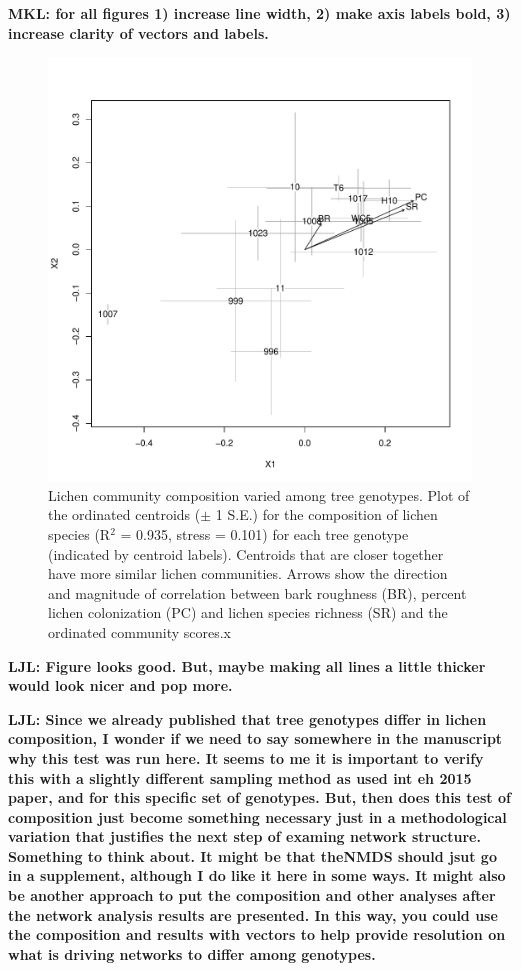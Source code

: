 \documentclass[9pt,twocolumn,twoside,lineno]{pnas-new}
\begin{document}
{\textbf{MKL: for all figures 1) increase line width, 2) make axis
  labels bold, 3) increase clarity of vectors and labels.}

\begin{figure}[ht]
\centering
\includegraphics[width=\linewidth]{com_chplot_onc.pdf}
\caption{Lichen community composition varied among tree
  genotypes. Plot of the ordinated centroids ($\pm$ 1 S.E.) for the
  composition of lichen species (R$^2$ = 0.935, stress = 0.101) for
  each tree genotype (indicated by centroid labels). Centroids that
  are closer together have more similar lichen communities. Arrows
  show the direction and magnitude of correlation between bark
  roughness (BR), percent lichen colonization (PC) and lichen species
  richness (SR) and the ordinated community scores.x}
\label{fig:com_ch_plot}
\end{figure}

\textbf{LJL: Figure looks good. But, maybe making all lines a little
  thicker would look nicer and pop more.}

\textbf{LJL: Since we already published that tree genotypes differ in
  lichen composition, I wonder if we need to say somewhere in the
  manuscript why this test was run here. It seems to me it is
  important to verify this with a slightly different sampling method
  as used int eh 2015 paper, and for this specific set of
  genotypes. But, then does this test of composition just become
  something necessary just in a methodological variation that
  justifies the next step of examing network structure.  Something to
  think about. It might be that theNMDS should jsut go in a
  supplement, although I do like it here in some ways.  It might also
  be another approach to put the composition and other analyses after
  the network analysis results are presented. In this way, you could
  use the composition and results with vectors to help provide
  resolution on what is driving networks to differ among genotypes.}


}
\end{document}

